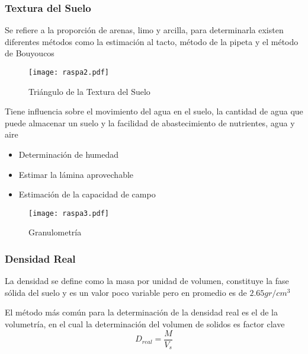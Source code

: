 \subsubsection{Textura del Suelo}
Se refiere a la proporción de arenas, limo y arcilla, para determinarla existen diferentes métodos como la estimación al tacto, método de la pipeta y el método de Bouyoucos
\begin{figure}[h!]
\centering
  \texttt{[image: raspa2.pdf]}
  \caption{Triángulo de la Textura del Suelo}
  \label{raspa2}
\end{figure}
Tiene influencia sobre el movimiento del agua en el suelo, la cantidad de agua que puede almacenar un suelo y la facilidad de abastecimiento de nutrientes, agua y aire
\begin{itemize}
    \item Determinación de humedad 
    \item Estimar la lámina aprovechable
    \item Estimación de la capacidad de campo
\end{itemize}
\begin{figure}[h!]
\centering
  \texttt{[image: raspa3.pdf]}
  \caption{Granulometría}
  \label{raspa3}
\end{figure}
\subsubsection{Densidad Real}
La densidad se define como la masa por unidad de volumen, constituye la fase sólida del suelo y es un valor poco variable pero en promedio es de $2.65gr/cm^3$

El método más común para la determinación de la densidad real es el de la volumetría, en el cual la determinación del volumen de solidos es factor clave
\begin{equation}
    D_{real} = \frac{M}{V_s}
\end{equation}
